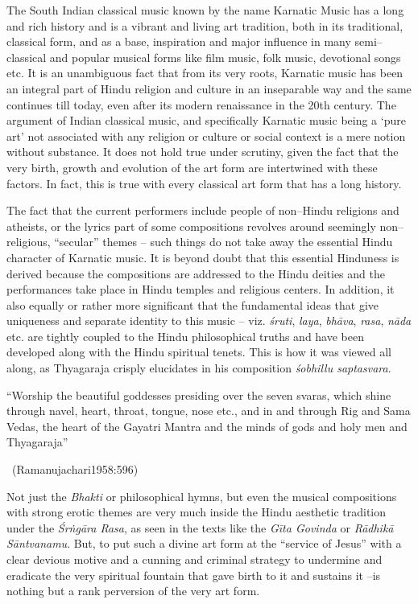 The South Indian classical music known by the name Karnatic Music has a long and rich history and is a vibrant and living art tradition, both in its traditional, classical form, and as a base, inspiration and major influence in many semi–classical and popular musical forms like film music, folk music, devotional songs etc. It is an unambiguous fact that from its very roots, Karnatic music has been an integral part of Hindu religion and culture in an inseparable way and the same continues till today, even after its modern renaissance in the 20th century. The argument of Indian classical music, and specifically Karnatic music being a ‘pure art’ not associated with any religion or culture or social context is a mere notion without substance. It does not hold true under scrutiny, given the fact that the very birth, growth and evolution of the art form are intertwined with these factors. In fact, this is true with every classical art form that has a long history.

The fact that the current performers include people of non–Hindu religions and atheists, or the lyrics part of some compositions revolves around seemingly non–religious, “secular” themes – such things do not take away the essential Hindu character of Karnatic music. It is beyond doubt that this essential Hinduness is derived because the compositions are addressed to the Hindu deities and the performances take place in Hindu temples and religious centers. In addition, it also equally or rather more significant that the fundamental ideas that give uniqueness and separate identity to this music – viz. \textit{śruti}, \textit{laya}, \textit{bhāva}, \textit{rasa}, \textit{nāda} etc. are tightly coupled to the Hindu philosophical truths and have been developed along with the Hindu spiritual tenets. This is how it was viewed all along, as Thyagaraja crisply elucidates in his composition \textit{śobhillu saptasvara}.

\begin{myquote}
“Worship the beautiful goddesses presiding over the seven svaras, which shine through navel, heart, throat, tongue, nose etc., and in and through Rig and Sama Vedas, the heart of the Gayatri Mantra and the minds of gods and holy men and Thyagaraja” 

~\hfill (Ramanujachari1958:596)
\end{myquote}

Not just the \textit{Bhakti} or philosophical hymns, but even the musical compositions with strong erotic themes are very much inside the Hindu aesthetic tradition under the \textit{Śrṅgāra Rasa}, as seen in the texts like the \textit{Gīta Govinda} or \textit{Rādhikā Sāntvanamu}. But, to put such a divine art form at the “service of Jesus” with a clear devious motive and a cunning and criminal strategy to undermine and eradicate the very spiritual fountain that gave birth to it and sustains it –is nothing but a rank perversion of the very art form.


